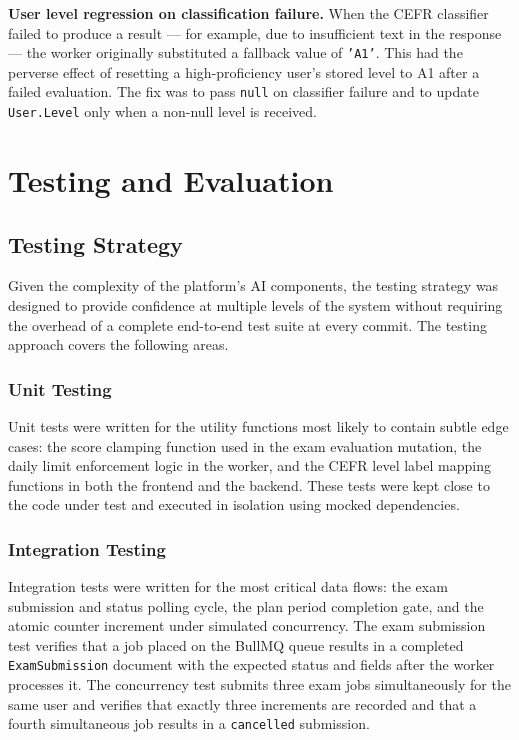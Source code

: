 \documentclass[12pt, a4paper]{report}
\begin{document}
\textbf{User level regression on classification failure.} When the CEFR classifier failed to produce a result — for example, due to insufficient text in the response — the worker originally substituted a fallback value of \texttt{'A1'}. This had the perverse effect of resetting a high-proficiency user's stored level to A1 after a failed evaluation. The fix was to pass \texttt{null} on classifier failure and to update \texttt{User.Level} only when a non-null level is received.

\chapter{Testing and Evaluation}
\label{ch:testing}

\section{Testing Strategy}

Given the complexity of the platform's AI components, the testing strategy was designed to provide confidence at multiple levels of the system without requiring the overhead of a complete end-to-end test suite at every commit. The testing approach covers the following areas.

\subsection{Unit Testing}

Unit tests were written for the utility functions most likely to contain subtle edge cases: the score clamping function used in the exam evaluation mutation, the daily limit enforcement logic in the worker, and the CEFR level label mapping functions in both the frontend and the backend. These tests were kept close to the code under test and executed in isolation using mocked dependencies.

\subsection{Integration Testing}

Integration tests were written for the most critical data flows: the exam submission and status polling cycle, the plan period completion gate, and the atomic counter increment under simulated concurrency. The exam submission test verifies that a job placed on the BullMQ queue results in a completed \texttt{ExamSubmission} document with the expected status and fields after the worker processes it. The concurrency test submits three exam jobs simultaneously for the same user and verifies that exactly three increments are recorded and that a fourth simultaneous job results in a \texttt{cancelled} submission.
\end{document}
